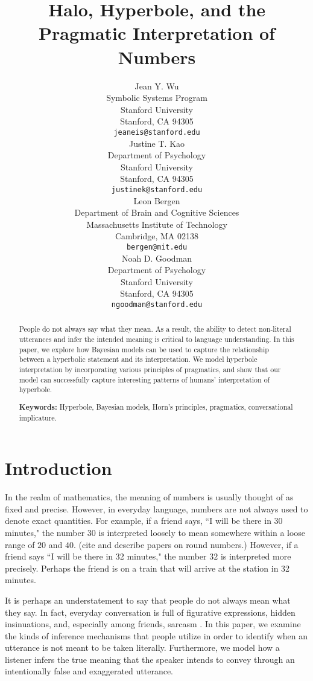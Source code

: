 \documentclass{article} %
\title{Halo, Hyperbole, and the Pragmatic Interpretation of Numbers}
\author{
Jean Y. Wu \\
Symbolic Systems Program\\
Stanford University\\
Stanford, CA 94305 \\
\texttt{jeaneis@stanford.edu} \\
\And
Justine T. Kao \\
Department of Psychology\\
Stanford University \\
Stanford, CA 94305 \\
\texttt{justinek@stanford.edu} \\
\AND
Leon Bergen \\
Department of Brain and Cognitive Sciences\\
Massachusetts Institute of Technology \\
Cambridge, MA 02138\\
\texttt{bergen@mit.edu} \\
\And
Noah D. Goodman \\
Department of Psychology\\
Stanford University \\ 
Stanford, CA 94305\\
\texttt{ngoodman@stanford.edu} \\
}
\begin{document}
\maketitle

\begin{abstract}
People do not always say what they mean. As a result, the ability to detect non-literal utterances and infer the intended meaning is critical to language understanding. In this paper, we explore how Bayesian models can be used to capture the relationship between a hyperbolic statement and its interpretation. We model hyperbole interpretation by incorporating various principles of pragmatics, and show that our model can successfully capture interesting patterns of humans' interpretation of hyperbole.

\textbf{Keywords:} 
Hyperbole, Bayesian models, Horn's principles, pragmatics, conversational implicature.
\end{abstract}


\section{Introduction}

In the realm of mathematics, the meaning of numbers is usually thought of as fixed and precise. However, in everyday language, numbers are not always used to denote exact quantities. For example, if a friend says, ``I will be there in 30 minutes," the number $30$ is interpreted loosely to mean somewhere within a loose range of $20$ and $40$. (cite and describe papers on round numbers.) However, if a friend says ``I will be there in 32 minutes," the number $32$ is interpreted more precisely. Perhaps the friend is on a train that will arrive at the station in 32 minutes. 


It is perhaps an understatement to say that people do not always mean what they say. In fact, everyday conversation is full of figurative expressions, hidden insinuations, and, especially among friends, sarcasm \cite{gibbs2000irony}. In this paper, we examine the kinds of inference mechanisms that people utilize in order to identify when an utterance is not meant to be taken literally. Furthermore, we model how a listener infers the true meaning that the speaker intends to convey through an intentionally false and exaggerated utterance.
\end{document}

